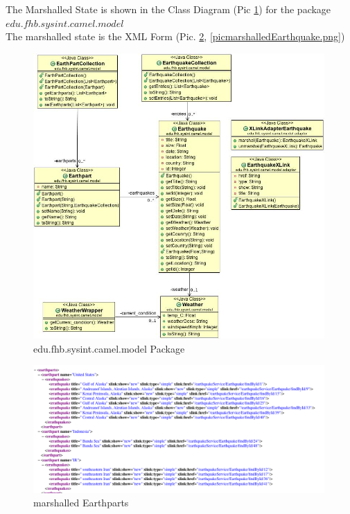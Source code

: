 \documentclass[11pt,english,ngerman, headsepline]{scrreprt}
\begin{document}
The Marshalled State is shown in the Class Diagram (Pic \ref{modelDia.JPG}) for
the package\\ $edu.fhb.sysint.camel.model$\\
The marshalled state is the XML Form (Pic. \ref{picmarshalledEarthparts},
\ref{picmarshalledEarthquake.png})

 \begin{figure}[h!]
	\begin{center}
	\includegraphics[width=0.99\textwidth]{pics/modelDia.JPG}
	\end{center}
	\caption{edu.fhb.sysint.camel.model Package}
	\label{modelDia.JPG} 
   \end{figure}
   
   
   \begin{figure}[h!]
	\begin{center}
	\includegraphics[width=0.99\textwidth]{pics/marshalledEarthparts}
	\end{center}
	\caption{marshalled Earthparts}
	\label{picmarshalledEarthparts} 
   \end{figure}
   
\end{document}
